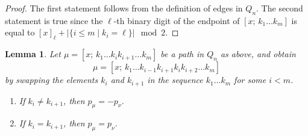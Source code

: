 \documentclass[a4paper]{amsart}
\newtheorem{lemma}[thm]{Lemma}
\begin{document}
\begin{proof}
    The first statement follows from the definition of edges in $Q_n$. The second statement is true since the $\ell$-th binary digit of the endpoint of $[x; \, k_1 \dots k_m]$ is equal to $[x]_\ell + |\{i \leq m \mid k_i = \ell\}| \mod 2$.
\end{proof}

\begin{lemma}
    Let $\mu = [x; \, k_1 \dots k_i k_{i+1} \dots k_m]$ be a path in $Q_n$ as above, and obtain 
    $$
    \mu = [x; \, k_1 \dots k_{i-1} k_{i+1} k_i k_{i+2} \dots k_m]
    $$ 
    by swapping the elements $k_i$ and $k_{i+1}$ in the sequence $k_1 \dots k_m$ for some $i < m$.
    \begin{enumerate}
        \item If $k_i \neq k_{i+1}$, then $p_\mu = - p_\nu$.
        \item If $k_i = k_{i+1}$, then $p_\mu = p_\nu$.
    \end{enumerate}
\end{lemma}
\end{document}
